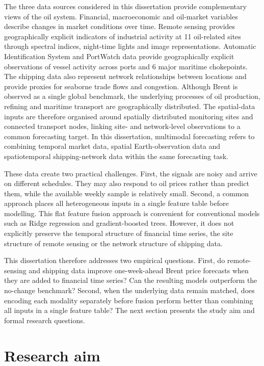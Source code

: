 \documentclass[
  british,
  12pt,
  oneside]{book}
\begin{document}
The three data sources considered in this dissertation provide complementary views of the oil system. Financial, macroeconomic and oil-market variables describe changes in market conditions over time. Remote sensing provides geographically explicit indicators of industrial activity at 11 oil-related sites through spectral indices, night-time lights and image representations. Automatic Identification System and PortWatch data provide geographically explicit observations of vessel activity across ports and 6 major maritime chokepoints. The shipping data also represent network relationships between locations and provide proxies for seaborne trade flows and congestion. Although Brent is observed as a single global benchmark, the underlying processes of oil production, refining and maritime transport are geographically distributed. The spatial-data inputs are therefore organised around spatially distributed monitoring sites and connected transport nodes, linking site- and network-level observations to a common forecasting target. In this dissertation, multimodal forecasting refers to combining temporal market data, spatial Earth-observation data and spatiotemporal shipping-network data within the same forecasting task.

These data create two practical challenges. First, the signals are noisy and arrive on different schedules. They may also respond to oil prices rather than predict them, while the available weekly sample is relatively small. Second, a common approach places all heterogeneous inputs in a single feature table before modelling. This flat feature fusion approach is convenient for conventional models such as Ridge regression and gradient-boosted trees. However, it does not explicitly preserve the temporal structure of financial time series, the site structure of remote sensing or the network structure of shipping data.

This dissertation therefore addresses two empirical questions. First, do remote-sensing and shipping data improve one-week-ahead Brent price forecasts when they are added to financial time series? Can the resulting models outperform the no-change benchmark? Second, when the underlying data remain matched, does encoding each modality separately before fusion perform better than combining all inputs in a single feature table? The next section presents the study aim and formal research questions.

\section{Research aim}\label{intro-aim}
\end{document}

